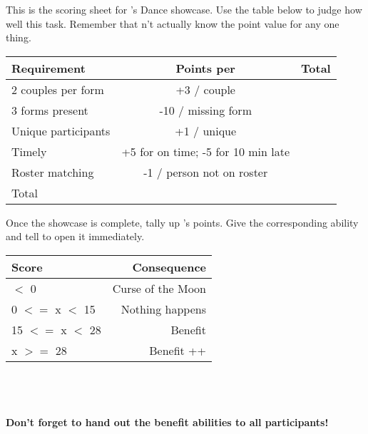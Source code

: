 \documentclass[green]{NeptuneBall}
\begin{document}
\name{\gDanceScoring{}}

This is the scoring sheet for \cPrincess{}'s Dance showcase. Use the table below to judge how well \cPrincess{\they}  this task. Remember that \cPrincess{\they} \cPrincess{\does}n't actually know the point value for any one thing.

\begin{tabular}{| l | c | r |}
  \hline
  Requirement & Points per & Total \\ \hline \hline
  2 couples per form & +3 / couple & \hspace{2cm} \\ \hline
  3 forms present & -10 / missing form & \hspace{2cm} \\ \hline
  Unique participants & +1 / unique & \hspace{2cm} \\ \hline
  Timely & +5 for on time; -5 for 10 min late & \hspace{2cm} \\ \hline
  Roster matching & -1 / person not on roster & \hspace{2cm} \\ \hline \hline
  Total & & \hspace{2cm} \\ \hline
\end{tabular}

Once the showcase is complete, tally up \cPrincess{}'s points. Give \cPrincess{\them} the corresponding ability and tell \cPrincess{\them} to open it immediately.
  
\begin{tabular}{| l | r|}
 \hline
 Score & Consequence \\ \hline \hline
 $<$ 0 & Curse of the Moon \\ \hline
 0 $<=$ x $<$ 15 & Nothing happens \\ \hline
 15 $<=$ x $<$ 28 & Benefit \\ \hline
 x  $>=$ 28 & Benefit ++ \\ \hline
\end{tabular}
\\
\\
\\
{\bf Don't forget to hand out the benefit abilities to all participants!}
\end{document}
